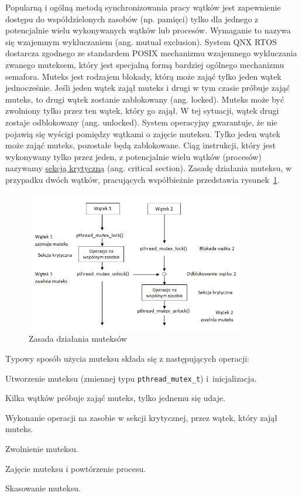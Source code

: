 Popularną i ogólną metodą synchronizowania pracy wątków jest zapewnienie dostępu do współdzielonych zasobów (np. pamięci) tylko dla jednego z potencjalnie wielu wykonywanych wątków lub procesów. Wymaganie to nazywa się wzajemnym wykluczaniem (ang. mutual exclusion). System QNX RTOS dostarcza zgodnego ze standardem POSIX mechanizmu wzajemnego wykluczania zwanego muteksem, który jest specjalną formą bardziej ogólnego mechanizmu semafora. Muteks jest rodzajem blokady, którą może zająć tylko jeden wątek jednocześnie. Jeśli jeden wątek zajął muteks i drugi w tym czasie próbuje zająć muteks, to drugi wątek zostanie zablokowany (ang. locked). Muteks może być zwolniony tylko przez ten wątek, który go zajął. W tej sytuacji, wątek drugi zostaje odblokowany (ang. unlocked). System operacyjny gwarantuje, że nie pojawią się wyścigi pomiędzy wątkami o zajęcie muteksu. Tylko jeden wątek może zająć muteks, pozostałe będą zablokowane. Ciąg instrukcji, który jest wykonywany tylko przez jeden, z potencjalnie wielu wątków (procesów) nazywamy \underline{sekcją krytyczną} (ang. critical section). Zasadę działania muteksu, w przypadku dwóch wątków, pracujących współbieżnie przedstawia rysunek~\ref{fig:YVN1V}.

\begin{figure}[!h]
\centering
\includegraphics[width=0.85\textwidth]{img/mutex}
\caption{Zasada działania muteksów}
\label{fig:YVN1V}
\end{figure}

Typowy sposób użycia muteksu składa się z następujących operacji:

\begin{myenumerate}
\item Utworzenie muteksu (zmiennej typu \lstinline[style=MyCStyle]{pthread_mutex_t}) i~inicjalizacja.
\item Kilka wątków próbuje zająć muteks, tylko jednemu się udaje.
\item Wykonanie operacji na zasobie w sekcji krytycznej, przez wątek, który zajął muteks.
\item Zwolnienie muteksu.
\item Zajęcie muteksu i powtórzenie procesu.
\item Skasowanie muteksu.
\end{myenumerate}

